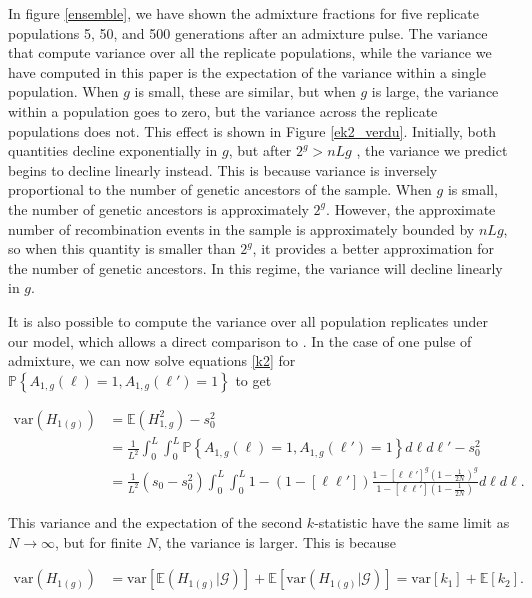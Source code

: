 \documentclass[11pt]{amsart}
\begin{document}
In figure \ref{ensemble}, we have shown the admixture fractions for five replicate populations 5, 50, and 500 generations after an admixture pulse. The variance that \citep{verdu2011general} compute variance over all the replicate populations, while the variance we have computed in this paper is the expectation of the variance within a single population. When $g$ is small, these are similar, but when $g$ is large, the variance within a population goes to zero, but the variance across the replicate populations does not. This effect is shown in Figure \ref{ek2_verdu}. Initially, both quantities decline exponentially in $g$, but after $2^g > nLg$ 
, the variance we predict begins to decline linearly instead. This is because variance is inversely proportional to the number of genetic ancestors of the sample. When $g$ is small, the number of genetic ancestors is approximately $2^g$. However, the approximate number of recombination events in the sample is approximately bounded by $nLg$, so when this quantity is smaller than $2^g$, it provides a better approximation for the number of genetic ancestors. In this regime, the variance will decline linearly in $g$.

It is also possible to compute the variance over all population replicates under our model, which allows a direct comparison to \citet{verdu2011general}.
In the case of one pulse of admixture, we can now solve equations \ref{k2} for $\mathbb{P}\left\{A_{1,g}(\ell)=1, A_{1,g}(\ell')=1\right\}$ to get

\begin{align}\nonumber
	\text{var}(H_{1(g)})&=\mathbb{E}(H_{1,g}^2)-s_{0}^2\\
		&=\frac{1}{L^2}\int_0^L\int_0^L\mathbb{P}\left\{A_{1,g}(\ell)=1, A_{1,g}(\ell')=1\right\} d\ell d\ell'-s_{0}^2\nonumber\\
		&=\frac{1}{L^2}\left(s_{0}-s_{0}^2\right)\int_0^L\int_0^L1-\left(1-[\ell\ell']\right)\frac{1-[\ell\ell']^g\left(1-\frac{1}{2N}\right)^g}{1-[\ell\ell']\left(1-\frac{1}{2N}\right)} d\ell d\ell.
		\label{var}
\end{align}

This variance and the expectation of the second $k$-statistic have the same limit as $N\rightarrow\infty$, but for finite $N$, the variance is larger.
This is because

\begin{align*}
\text{var}(H_{1(g)})&=
	\text{var}\left[\mathbb{E}(H_{1(g)}|\mathcal{G})\right]
	+\mathbb{E}\left[\text{var}(H_{1(g)}|\mathcal{G})\right]=\text{var}[k_1]+\mathbb{E}[k_2].
\end{align*}
\end{document}
